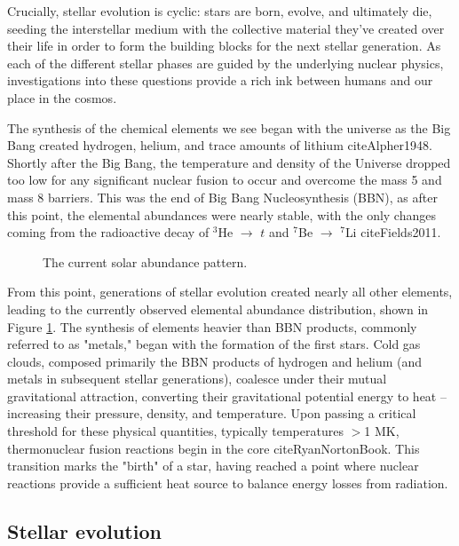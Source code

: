 \noindent Crucially, stellar evolution is cyclic: stars are born, evolve, and ultimately die, seeding the interstellar medium with the collective material they've created over their life in order to form the building blocks for the next stellar generation. As each of the different stellar phases are guided by the underlying nuclear physics, investigations into these questions provide a rich ink between humans and our place in the cosmos. 

The synthesis of the chemical elements we see began with the universe as the Big Bang created hydrogen, helium, and trace amounts of lithium cite{Alpher1948}. Shortly after the Big Bang, the temperature and density of the Universe dropped too low for any significant nuclear fusion to occur and overcome the mass 5 and mass 8 barriers. This was the end of Big Bang Nucleosynthesis (BBN), as after this point, the elemental abundances were nearly stable, with the only changes coming from the radioactive decay of $^{3}$He $\rightarrow$ $t$ and $^{7}$Be $\rightarrow$ $^{7}$Li cite{Fields2011}.

\begin{figure}
\label{fig: abundances}
\caption{The current solar abundance pattern. }
\end{figure}

From this point, generations of stellar evolution created nearly all other elements, leading to the currently observed elemental abundance distribution, shown in Figure \ref{fig: abundances}. The synthesis of elements heavier than BBN products, commonly referred to as "metals," began with the formation of the first stars. Cold gas clouds, composed primarily the BBN products of hydrogen and helium (and metals in subsequent stellar generations), coalesce under their mutual gravitational attraction, converting their gravitational potential energy to heat -- increasing their pressure, density, and temperature. Upon passing a critical threshold for these physical quantities, typically temperatures $>$1 MK, thermonuclear fusion reactions begin in the core cite{RyanNortonBook}. This transition marks the "birth" of a star, having reached a point where nuclear reactions provide a sufficient heat source to balance energy losses from radiation. 


\subsection{Stellar evolution}

